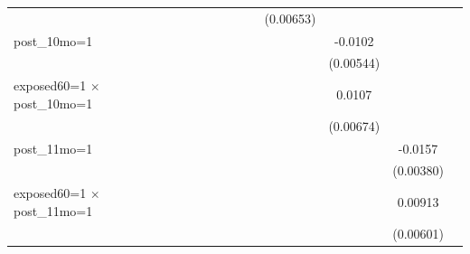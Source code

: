 \begin{table}[htbp]
\begin{tabular}{l*{11}{c}}
                    &                     &                     &                     &                     &                     &                     &                     &   (0.00653)         &                     &                     &                     \\
\addlinespace
post\_10mo=1         &                     &                     &                     &                     &                     &                     &                     &                     &     -0.0102         &                     &                     \\
                    &                     &                     &                     &                     &                     &                     &                     &                     &   (0.00544)         &                     &                     \\
\addlinespace
exposed60=1 $\times$ post\_10mo=1&                     &                     &                     &                     &                     &                     &                     &                     &      0.0107         &                     &                     \\
                    &                     &                     &                     &                     &                     &                     &                     &                     &   (0.00674)         &                     &                     \\
\addlinespace
post\_11mo=1         &                     &                     &                     &                     &                     &                     &                     &                     &                     &     -0.0157\sym{**} &                     \\
                    &                     &                     &                     &                     &                     &                     &                     &                     &                     &   (0.00380)         &                     \\
\addlinespace
exposed60=1 $\times$ post\_11mo=1&                     &                     &                     &                     &                     &                     &                     &                     &                     &     0.00913         &                     \\
                    &                     &                     &                     &                     &                     &                     &                     &                     &                     &   (0.00601)         &                     \\

\end{tabular}
\end{table}
